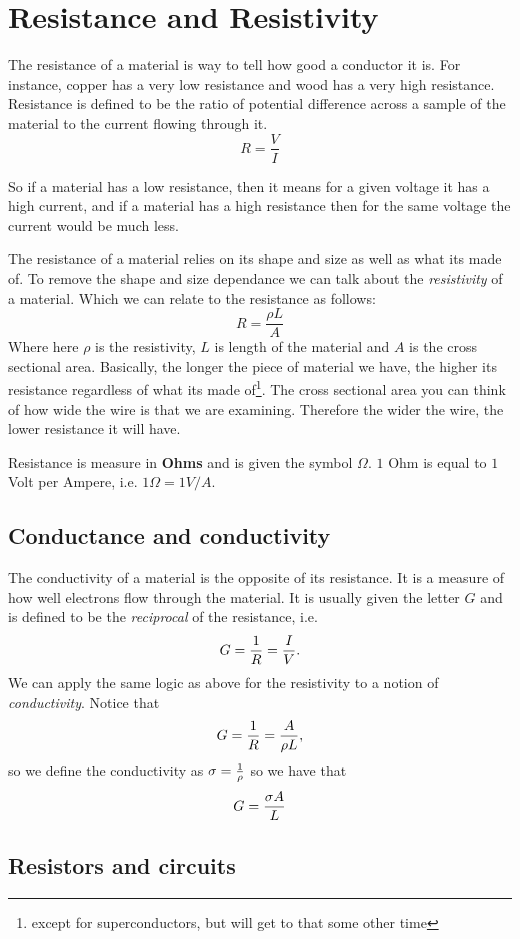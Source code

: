\documentclass[12pt]{article}
\begin{document}
\section{Resistance and
Resistivity}\label{resistance-and-resistivity}

The resistance of a material is way to tell how good a conductor it is.
For instance, copper has a very low resistance and wood has a very high
resistance. Resistance is defined to be the ratio of potential
difference across a sample of the material to the current flowing
through it. \[R = \frac{V}{I}\]

So if a material has a low resistance, then it means for a given voltage
it has a high current, and if a material has a high resistance then for
the same voltage the current would be much less.

The resistance of a material relies on its shape and size as well as
what its made of. To remove the shape and size dependance we can talk
about the \emph{resistivity} of a material. Which we can relate to the
resistance as follows: \[R = \frac{\rho L}{A}\] Where here \(\rho\) is
the resistivity, \(L\) is length of the material and \(A\) is the cross
sectional area. Basically, the longer the piece of material we have, the
higher its resistance regardless of what its made of\footnote{except for
  superconductors, but will get to that some other time}. The cross
sectional area you can think of how wide the wire is that we are
examining. Therefore the wider the wire, the lower resistance it will
have.

Resistance is measure in \textbf{Ohms} and is given the symbol
\(\Omega\). \(1\) Ohm is equal to \(1\) Volt per Ampere, i.e.
\(1\Omega = 1 V/ A\).

\subsection{Conductance and conductivity}\label{conductance-and-conductivity}
The conductivity of a material is the opposite of its resistance. It is a measure of how well electrons flow through the material. It is usually given the letter $G$ and is defined to be the \emph{reciprocal} of the resistance, i.e. $$G = {1\over R} = {I\over V}.$$
We can apply the same logic as above for the resistivity to a notion of \emph{conductivity}. Notice that 
$$G = {1 \over R} = {A \over \rho L},$$
so we define the conductivity as $\sigma = {1 \over \rho}$ so we have that 
$$G = {\sigma A \over L}$$

\subsection{Resistors and circuits}\label{resistors-and-circuits}
\end{document}
